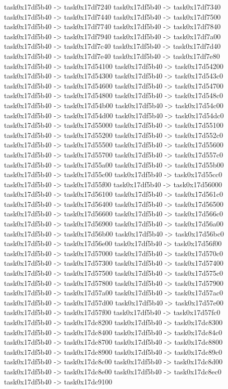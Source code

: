 {	task0x17df5b40 -> task0x17df7240
	task0x17df5b40 -> task0x17df7340
	task0x17df5b40 -> task0x17df7440
	task0x17df5b40 -> task0x17df7500
	task0x17df5b40 -> task0x17df7740
	task0x17df5b40 -> task0x17df7840
	task0x17df5b40 -> task0x17df7940
	task0x17df5b40 -> task0x17df7a00
	task0x17df5b40 -> task0x17df7c40
	task0x17df5b40 -> task0x17df7d40
	task0x17df5b40 -> task0x17df7e40
	task0x17df5b40 -> task0x17df7e80
	task0x17df5b40 -> task0x17d54100
	task0x17df5b40 -> task0x17d54200
	task0x17df5b40 -> task0x17d54300
	task0x17df5b40 -> task0x17d543c0
	task0x17df5b40 -> task0x17d54600
	task0x17df5b40 -> task0x17d54700
	task0x17df5b40 -> task0x17d54800
	task0x17df5b40 -> task0x17d548c0
	task0x17df5b40 -> task0x17d54b00
	task0x17df5b40 -> task0x17d54c00
	task0x17df5b40 -> task0x17d54d00
	task0x17df5b40 -> task0x17d54dc0
	task0x17df5b40 -> task0x17d55000
	task0x17df5b40 -> task0x17d55100
	task0x17df5b40 -> task0x17d55200
	task0x17df5b40 -> task0x17d552c0
	task0x17df5b40 -> task0x17d55500
	task0x17df5b40 -> task0x17d55600
	task0x17df5b40 -> task0x17d55700
	task0x17df5b40 -> task0x17d557c0
	task0x17df5b40 -> task0x17d55a00
	task0x17df5b40 -> task0x17d55b00
	task0x17df5b40 -> task0x17d55c00
	task0x17df5b40 -> task0x17d55cc0
	task0x17df5b40 -> task0x17d55f00
	task0x17df5b40 -> task0x17d56000
	task0x17df5b40 -> task0x17d56100
	task0x17df5b40 -> task0x17d561c0
	task0x17df5b40 -> task0x17d56400
	task0x17df5b40 -> task0x17d56500
	task0x17df5b40 -> task0x17d56600
	task0x17df5b40 -> task0x17d566c0
	task0x17df5b40 -> task0x17d56900
	task0x17df5b40 -> task0x17d56a00
	task0x17df5b40 -> task0x17d56b00
	task0x17df5b40 -> task0x17d56bc0
	task0x17df5b40 -> task0x17d56e00
	task0x17df5b40 -> task0x17d56f00
	task0x17df5b40 -> task0x17d57000
	task0x17df5b40 -> task0x17d570c0
	task0x17df5b40 -> task0x17d57300
	task0x17df5b40 -> task0x17d57400
	task0x17df5b40 -> task0x17d57500
	task0x17df5b40 -> task0x17d575c0
	task0x17df5b40 -> task0x17d57800
	task0x17df5b40 -> task0x17d57900
	task0x17df5b40 -> task0x17d57a00
	task0x17df5b40 -> task0x17d57ac0
	task0x17df5b40 -> task0x17d57d00
	task0x17df5b40 -> task0x17d57e00
	task0x17df5b40 -> task0x17d57f00
	task0x17df5b40 -> task0x17d57fc0
	task0x17df5b40 -> task0x17dc8200
	task0x17df5b40 -> task0x17dc8300
	task0x17df5b40 -> task0x17dc8400
	task0x17df5b40 -> task0x17dc84c0
	task0x17df5b40 -> task0x17dc8700
	task0x17df5b40 -> task0x17dc8800
	task0x17df5b40 -> task0x17dc8900
	task0x17df5b40 -> task0x17dc89c0
	task0x17df5b40 -> task0x17dc8c00
	task0x17df5b40 -> task0x17dc8d00
	task0x17df5b40 -> task0x17dc8e00
	task0x17df5b40 -> task0x17dc8ec0
	task0x17df5b40 -> task0x17dc9100
}
